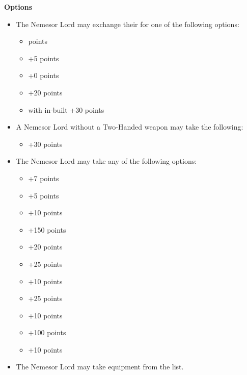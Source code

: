 \begin{minipage}[t]{0.72\textwidth}
	\vspace*{2em}
	\textbf{Options}
	\begin{itemize}
		\item The Nemesor Lord may exchange their  for one of the following options:
		\begin{itemize}			
			\item {}  points
			\item {} \dotfill +5 points
			\item {} \dotfill +0 points
			\item {} \dotfill +20 points
			\item {} with in-built  \dotfill +30 points
		\end{itemize}
		\item A Nemesor Lord without a Two-Handed weapon may take the following:
		\begin{itemize}
			\item {} \dotfill +30 points
		\end{itemize}
		\item The Nemesor Lord may take any of the following options:
		\begin{itemize}
			\item {} \dotfill +7 points
			\item {} \dotfill +5 points
			\item {} \dotfill +10 points
			\item {} \dotfill +150 points
			\item {} \dotfill +20 points
			\item {} \dotfill +25 points
			\item {} \dotfill +10 points
			\item {} \dotfill +25 points
			\item {} \dotfill +10 points
			\item {} \dotfill +100 points
			\item {} \dotfill +10 points
		\end{itemize}
		\item The Nemesor Lord may take equipment from the  list.
	\end{itemize}
\end{minipage}
